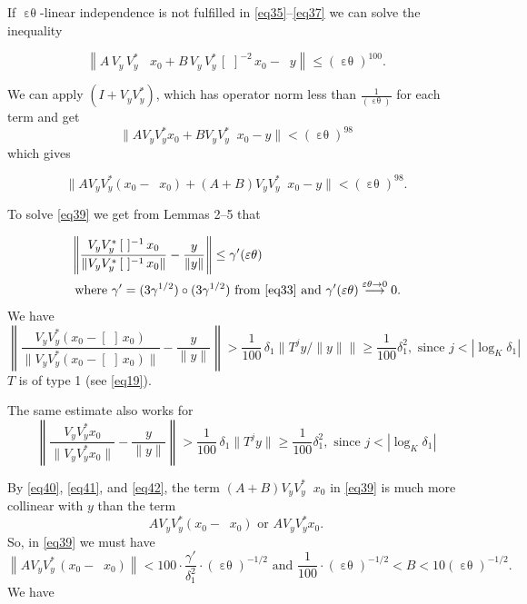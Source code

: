 \documentclass[12pt,oneside,reqno]{amsart}
\theoremstyle{definition}
\DeclareMathOperator*{\VV}{[\,\, ]^{-1}}
\DeclareMathOperator*{\VE}{\varepsilon\theta}
\begin{document}
If $\VE$-linear independence is not fulfilled in \eqref{eq35}--\eqref{eq37} we can solve the inequality

\begin{equation}\label{eq38}
	\left\| A \,  V_y \, V_y^* \,  \VV \,  x_0 + B  \,  V_y \,  V_y^* \,  [\, \,]^{-2} \,  x_0 - \VV y\right\| \le (\VE)^{100}.
\end{equation}

We can apply $(I + V_y V_y^*)$, which has operator norm less than $ \frac{1}{(\VE)}$ for each term and get
$$\|A V_y V_y^* x_0 + B V_y V_y^* \VV x_0 - y\| < (\VE)^{98}$$
 which gives 
 
 \begin{equation}\label{eq39}
 \|A V_y V_y^* (x_0 - \VV x_0) + (A+B) V_y V_y^* \VV x_0 - y\| < (\VE)^{98} .
 \end{equation}
 
To solve \eqref{eq39} we get from Lemmas 2--5 that

\begin{equation}\label{eq40}
	\begin{aligned} 
&\left\| \frac{V_y V_y^* \VV x_0}{\|V_y V_y^* \VV x_0\|} - \frac{y}{\|y\|}\right\| \le \gamma' (\VE)  \\
&\text{ where } \gamma' = (3 \gamma^{1/2}) \circ (3 \gamma^{1/2}) \text{ from \eqref{eq33} and } \gamma'(\VE)  \stackrel{\VE \rightarrow 0}{\longrightarrow} 0.
	\end{aligned}
\end{equation}
We have
\begin{equation}\label{eq41}
\left\| \frac{V_y V_y^* (x_0 - [\, \,]\,  x_0)}{\|V_y V_y^* (x_0 - [\, \,]\,  x_0)\|} - \frac{y}{\|y\|}\right\| > \frac{1}{100}\, \delta_1  \|T^j y/\|y\|\| \ge \frac{1}{100} \delta_1^2,  \text{ since } j < |\log_K \delta_1|
\end{equation}
 $T$ is of type 1 (see \eqref{eq19}).
 
 The same estimate also works for
 \begin{equation}\label{eq42}
 	\left\| \frac{V_y V_y^* x_0}{\|V_y V_y^* x_0\|} - \frac{y}{\|y\|}\right\| > \frac{1}{100}\, \delta_1  \|T^j y\| \ge \frac{1}{100} \delta_1^2 ,  \text{ since } j < |\log_K \delta_1|
 \end{equation}
 
 By \eqref{eq40},  \eqref{eq41},  and  \eqref{eq42}, the term $(A+B) V_y V_y^* \VV x_0$ in \eqref{eq39} is much more collinear with $y$ than the term 
 $$A V_y V_y^* (x_0 - \VV x_0) \text{ or } A V_y V_y^* x_0.$$
 So, in \eqref{eq39} we must have
 \begin{equation}\label{eq43}
 	\left\| A V_y V_y^* \, (x_0 - \VV x_0)\right\| < 100 \cdot \frac{\gamma'}{\delta_1^2} \cdot (\VE)^{-1/2} \text{ and } \frac{1}{100} \cdot (\VE)^{-1/2} < B < 10 (\VE)^{-1/2}.
 \end{equation}
 We have 
 
\end{document}
